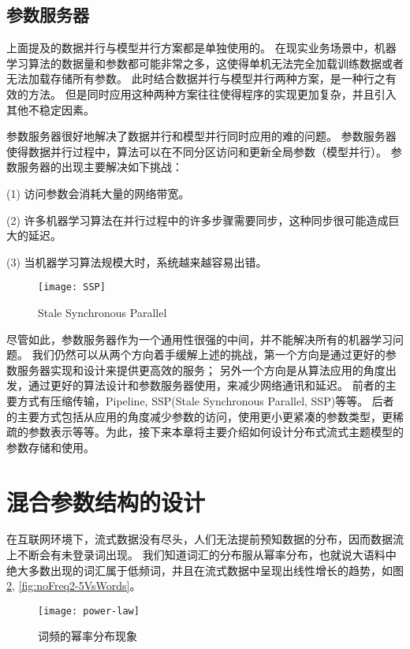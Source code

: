 \subsection{参数服务器}
上面提及的数据并行与模型并行方案都是单独使用的。
在现实业务场景中，机器学习算法的数据量和参数都可能非常之多，这使得单机无法完全加载训练数据或者无法加载存储所有参数。
此时结合数据并行与模型并行两种方案，是一种行之有效的方法。
但是同时应用这种两种方案往往使得程序的实现更加复杂，并且引入其他不稳定因素。

参数服务器很好地解决了数据并行和模型并行同时应用的难的问题。
参数服务器使得数据并行过程中，算法可以在不同分区访问和更新全局参数（模型并行）。
参数服务器的出现主要解决如下挑战：

(1) 访问参数会消耗大量的网络带宽。

(2) 许多机器学习算法在并行过程中的许多步骤需要同步，这种同步很可能造成巨大的延迟。

(3) 当机器学习算法规模大时，系统越来越容易出错。


\begin{figure}[htb]\centering
\texttt{[image: SSP]}
\caption{Stale Synchronous Parallel}
\label{fig:SSP}       %
\end{figure}

尽管如此，参数服务器作为一个通用性很强的中间，并不能解决所有的机器学习问题。
我们仍然可以从两个方向着手缓解上述的挑战，第一个方向是通过更好的参数服务器实现和设计来提供更高效的服务；
另外一个方向是从算法应用的角度出发，通过更好的算法设计和参数服务器使用，来减少网络通讯和延迟。
前者的主要方式有压缩传输，Pipeline, SSP(Stale Synchronous Parallel, SSP)等等。
后者的主要方式包括从应用的角度减少参数的访问，使用更小更紧凑的参数类型，更稀疏的参数表示等等。为此，接下来本章将主要介绍如何设计分布式流式主题模型的参数存储和使用。


\section{混合参数结构的设计}
在互联网环境下，流式数据没有尽头，人们无法提前预知数据的分布，因而数据流上不断会有未登录词出现。
我们知道词汇的分布服从幂率分布，也就说大语料中绝大多数出现的词汇属于低频词，并且在流式数据中呈现出线性增长的趋势，如图\ref{fig:power-law}, \ref{fig:noFreq2-5VsWords}。

\begin{figure}[htb]\centering
\texttt{[image: power-law]}
\caption{词频的幂率分布现象}
\label{fig:power-law}       %
\end{figure}

